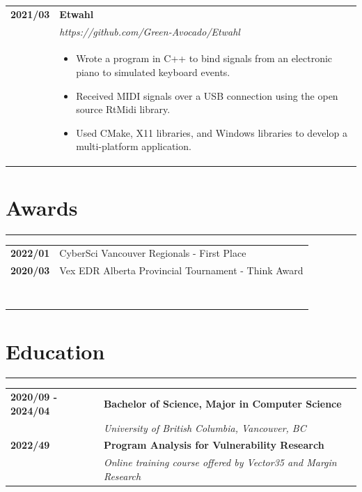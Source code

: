 \documentclass[letterpaper]{article}
\newcommand{\sectcolor}{cyan}
\newcommand{\sect}[1]{\section*{#1}
                        {\color{\sectcolor}
                        \rule{\textwidth}{1pt}
                        \vspace{-1ex}}}
\begin{document}
        \begin{tabular}{p{} p{}}
            \textbf{2021/03} & \textbf{Etwahl} \\
            & \emph{https://github.com/Green-Avocado/Etwahl} \\
            & \begin{itemize}
                \item Wrote a program in C++ to bind signals from an electronic piano to simulated
                    keyboard events.
                \item Received MIDI signals over a USB connection using the open source RtMidi library.
                \item Used CMake, X11 libraries, and Windows libraries to develop a multi-platform
                    application.
            \end{itemize}
        \end{tabular}

    \sect{Awards}

        \begin{tabular}{p{} p{}}
            \textbf{2022/01} & CyberSci Vancouver Regionals - First Place \\
            \textbf{2020/03} & Vex EDR Alberta Provincial Tournament - Think Award \\

            \\\\\\\\\\\\\\\\
        \end{tabular}

    \sect{Education}

        \begin{tabular}{p{} p{}}
            \textbf{2020/09 - 2024/04} & \large\textbf{Bachelor of Science, Major in Computer Science} \\
            & \emph{University of British Columbia, Vancouver, BC} \\
            \textbf{2022/49} & \large\textbf{Program Analysis for Vulnerability Research} \\
            & \emph{Online training course offered by Vector35 and Margin Research} \\
        \end{tabular}
\end{document}
